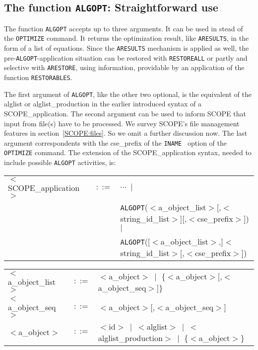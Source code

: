 \subsection{The function {\tt ALGOPT}: Straightforward use}\label{SCOPE:algo}

The function {\tt ALGOPT} accepts up to three arguments. It can be used in
stead of the {\tt OPTIMIZE} command. It returns the optimization result,
like {\tt ARESULTS}, in the form of a list of equations.
Since the {\tt ARESULTS} mechanism
is applied as well, the pre-{\tt ALGOPT}-application situation can be restored
with {\tt RESTOREALL} or partly and selective with {\tt ARESTORE}, using
information, providable by an application of the function {\tt RESTORABLES}.

The first argument of {\tt ALGOPT}, like the other two optional, is the
equivalent of the alglist or alglist\_production in the earlier introduced
syntax of a SCOPE\_application.
The second argument can be used to inform SCOPE
that input from file(s) have to be processed. We survey SCOPE's file
management features in section~\ref{SCOPE:files}. So we omit a further
discussion now. The last argument correspondents with the cse\_prefix
of the {\tt INAME } option of the {\tt OPTIMIZE} command. The extension
of the SCOPE\_application syntax, needed to include possible {\tt ALGOPT}
activities, is:

\begin{tabular}{lcl}
$<$SCOPE\_application$>$ & $::=$ & $\cdots~\mid~$\\
 & & {\tt ALGOPT}($<$a\_object\_list$>$[,$<$string\_id\_list$>$][,$<$cse\_prefix$>$]) $\mid$\\
 & & {\tt ALGOPT}([$<$a\_object\_list$>$,]$<$string\_id\_list$>$[,$<$cse\_prefix$>$])\\
\end{tabular}
\begin{tabular}{lcl}
$<$a\_object\_list$>$ & $::=$ & $<$a\_object$>~\mid$ \{$<$a\_object$>$[,$<$a\_object\_seq$>$]\}\\
$<$a\_object\_seq$>$ & $::=$ & $<$a\_object$>$[,$<$a\_object\_seq$>$]\\
$<$a\_object$>$ & $::=$ & $<$id$>~\mid~<$alglist$>~\mid~<$alglist\_production$>~\mid$
 \{$<$a\_object$>$\}
\end{tabular}

